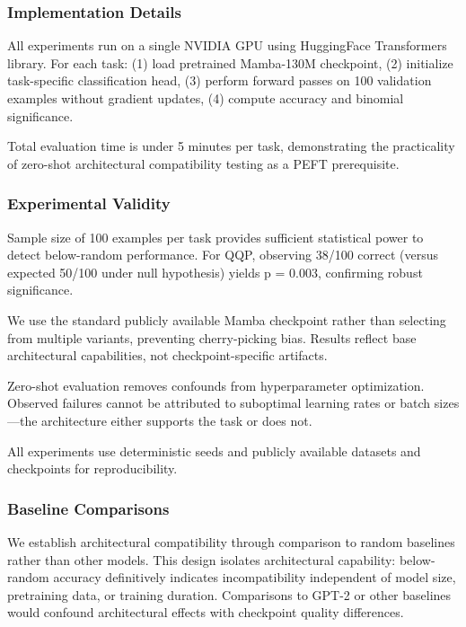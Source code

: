 \subsubsection{Implementation Details}

All experiments run on a single NVIDIA GPU using HuggingFace Transformers library. For each task: (1) load pretrained Mamba-130M checkpoint, (2) initialize task-specific classification head, (3) perform forward passes on 100 validation examples without gradient updates, (4) compute accuracy and binomial significance.

Total evaluation time is under 5 minutes per task, demonstrating the practicality of zero-shot architectural compatibility testing as a PEFT prerequisite.

\subsubsection{Experimental Validity}

Sample size of 100 examples per task provides sufficient statistical power to detect below-random performance. For QQP, observing 38/100 correct (versus expected 50/100 under null hypothesis) yields p = 0.003, confirming robust significance.

We use the standard publicly available Mamba checkpoint rather than selecting from multiple variants, preventing cherry-picking bias. Results reflect base architectural capabilities, not checkpoint-specific artifacts.

Zero-shot evaluation removes confounds from hyperparameter optimization. Observed failures cannot be attributed to suboptimal learning rates or batch sizes---the architecture either supports the task or does not.

All experiments use deterministic seeds and publicly available datasets and checkpoints for reproducibility.

\subsubsection{Baseline Comparisons}

We establish architectural compatibility through comparison to random baselines rather than other models. This design isolates architectural capability: below-random accuracy definitively indicates incompatibility independent of model size, pretraining data, or training duration. Comparisons to GPT-2 or other baselines would confound architectural effects with checkpoint quality differences.

